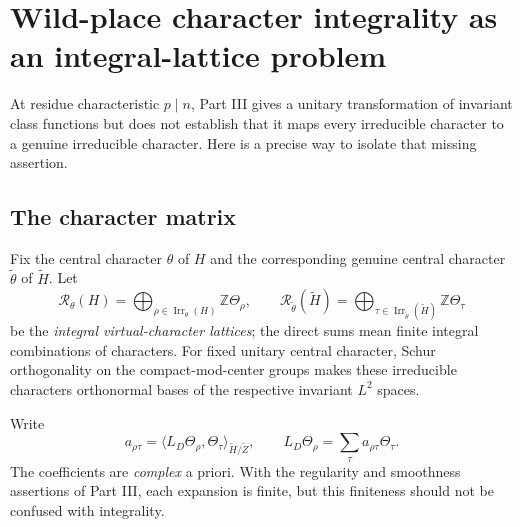 \documentclass[11pt]{article}
\newcommand{\Z}{\mathbb Z}
\newcommand{\Irr}{\operatorname{Irr}}
\theoremstyle{plain}
\theoremstyle{definition}
\begin{document}
\section{Wild-place character integrality as an integral-lattice problem}\label{sec:wild}
At residue characteristic $p\mid n$, Part III gives a unitary
transformation of invariant class functions but does not establish that
it maps every irreducible character to a genuine irreducible character.
Here is a precise way to isolate that missing assertion.

\subsection{The character matrix}\label{subsec:matrix}
Fix the central character $\theta$ of $H$ and the corresponding
genuine central character $\widetilde\theta$ of $\widetilde H$.
Let
\[
\mathcal R_\theta(H)=\bigoplus_{\rho\in\Irr_\theta(H)}\Z\Theta_\rho,
\qquad
\mathcal R_{\widetilde\theta}(\widetilde H)
=\bigoplus_{\tau\in\Irr_{\widetilde\theta}(\widetilde H)}
\Z\Theta_\tau
\]
be the \emph{integral virtual-character lattices}; the direct sums
mean finite integral combinations of characters.  For fixed unitary
central character, Schur orthogonality on the compact-mod-center
groups makes these irreducible characters orthonormal bases of the
respective invariant $L^2$ spaces.

Write
\begin{equation}\label{eq:coef}
 a_{\rho\tau}
 =\big\langle L_D\Theta_\rho,\Theta_\tau\big\rangle_{\widetilde H/\widetilde Z},
 \qquad L_D\Theta_\rho=\sum_\tau a_{\rho\tau}\Theta_\tau.
\end{equation}
The coefficients are \emph{complex} a priori.  With the regularity and
smoothness assertions of Part III, each expansion is finite, but this
finiteness should not be confused with integrality.
\end{document}
